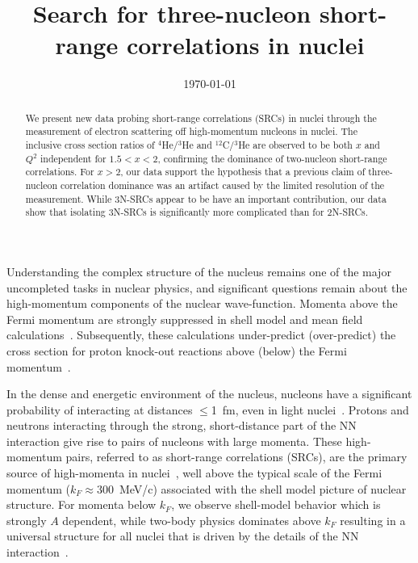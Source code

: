 \documentclass[aps,prl,superscriptaddress,showpacs,twocolumn,floatfix,amsmath,amssymb]{revtex4-1}
\begin{document}
\title{Search for three-nucleon short-range correlations in nuclei}



\date{\today}

\begin{abstract}

We present new data probing short-range correlations (SRCs) in nuclei through the measurement of electron scattering off high-momentum nucleons in
nuclei. The inclusive cross section ratios of $^4$He/$^3$He and $^{12}$C/$^3$He are observed to be both $x$ and $Q^2$ independent
for $1.5 < x <2$, confirming the dominance of two-nucleon short-range correlations. For $x>2$, our data support the hypothesis
that a previous claim of three-nucleon correlation dominance was an artifact caused by the limited resolution of the measurement. While
3N-SRCs appear to be have an important contribution, our data show that isolating 3N-SRCs is significantly more complicated than for 2N-SRCs.

\end{abstract}

\maketitle

%
Understanding the complex structure of the nucleus remains one of the major uncompleted tasks in nuclear physics, and significant questions remain about the high-momentum components of the nuclear wave-function. Momenta above the Fermi momentum are strongly suppressed in shell model and mean field calculations~\cite{DeForest1983}. Subsequently, these calculations under-predict (over-predict) the cross section for proton knock-out reactions above (below) the Fermi momentum~\cite{VanDerSteenhoven1988547, Lapikas1993297, Kelly:1996hd}.

In the dense and energetic environment of the nucleus, nucleons have a significant probability of
interacting at distances $\le$1~fm, even in light nuclei~\cite{carlson14,lu13}. Protons and neutrons
interacting through the strong, short-distance part of the NN interaction give rise to pairs of
nucleons with large momenta. These high-momentum pairs, referred to as short-range correlations (SRCs), are
the primary source of high-momenta in nuclei~\cite{Frankfurt1981215, SLAC_Measurement_PRC.48.2451,
src_john}, well above the typical scale of the Fermi momentum ($k_F \approx 300$~MeV/c) associated with the
shell model picture of nuclear structure. For momenta below $k_F$, we observe shell-model behavior which is
strongly $A$ dependent, while two-body physics dominates above $k_F$ resulting in a universal
structure for all nuclei that is driven by the details of the NN interaction~\cite{RevModPhys.80.189,
PhysRevC.53.1689, wiringa14}.
\end{document}
